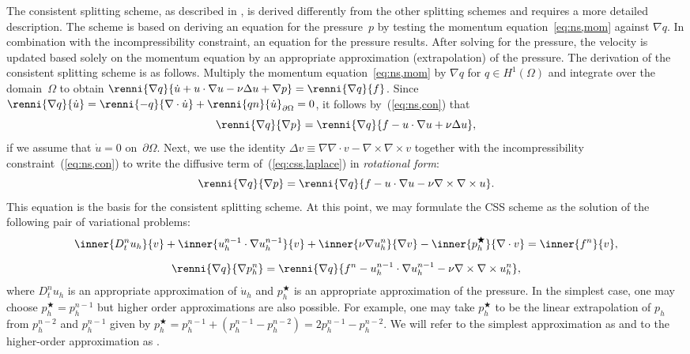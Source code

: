 The consistent splitting scheme, as described
in \citet{GuermondMinevShen2006,GuermondShen2003}, is derived
differently from the other splitting schemes and requires a more
detailed description. The scheme is based on deriving an equation for
the pressure~$p$ by testing the momentum equation~\eqref{eq:ns,mom}
against $\nabla q$.  In combination with the incompressibility
constraint, an equation for the pressure results. After solving for
the pressure, the velocity is updated based solely on the momentum
equation by an appropriate approximation (extrapolation) of the
pressure. The derivation of the consistent splitting scheme is as
follows. \pagebreak Multiply the momentum equation~\eqref{eq:ns,mom} by $\nabla
q$ for $q \in H^1(\Omega)$ and integrate over the domain~$\Omega$ to obtain
$\renni{\nabla q}{\dot{u} + u \cdot \nabla u - \nu \Delta u + \nabla
  p} = \renni{\nabla q}{f}$. Since $\renni{\nabla q}{\dot{u}} =
\renni{-q}{\nabla \cdot \dot{u}} + \renni{qn}{\dot{u}}_{\partial
  \Omega} = 0$, it follows by~(\ref{eq:ns,con}) that
\begin{equation}\label{eq:css,laplace}
  \renni{\nabla q}{\nabla p} = \renni{\nabla q}{f - u \cdot \nabla u +
    \nu \Delta u},
\end{equation}
if we assume that $\dot{u} = 0$ on~$\partial\Omega$. Next, we use the
identity $\Delta v \equiv \nabla \nabla \cdot v - \nabla \times \nabla
\times v$ together with the incompressibility
constraint~(\ref{eq:ns,con}) to write the diffusive term
of~(\ref{eq:css,laplace}) in
\emph{rotational form}:
\begin{equation}\label{eq:css,curl}
  \renni{\nabla q}{\nabla p} = \renni{\nabla q}{f - u \cdot \nabla u -
    \nu \nabla \times \nabla \times u}.
\end{equation}
This equation is the basis for the consistent splitting scheme. At
this point, we may formulate the CSS scheme as the solution of the
following pair of variational problems:
\begin{gather} \label{eq:css,u}
  \inner{D_t^n u_h}{v}
  + \inner{u_h^{n-1} \cdot \nabla u_h^{n-1}}{v}
  + \inner{\nu \nabla u_h^n}{\nabla v}
  - \inner{p_h^{\bigstar}}{\nabla \cdot v}
  = \inner{f^n}{v},\\[6pt]
 \label{eq:css,pn}
  \renni{\nabla q}{\nabla p_h^n} =
  \renni{\nabla q}{f^n - u_h^{n-1} \cdot \nabla u_h^{n-1} - \nu \nabla \times \nabla \times u_h^n},
\end{gather}
where $D_t^n u_h$ is an appropriate approximation of $\dot{u}_h$ and
$p^{\bigstar}_h$ is an appropriate approximation of the pressure. In
the simplest case, one may choose $p_h^{\bigstar} = p_h^{n-1}$ but
higher order approximations are also possible. For example, one may
take $p_h^{\bigstar}$ to be the linear extrapolation of $p_h$ from
$p_h^{n-2}$ and $p_h^{n-1}$ given by $p_h^{\bigstar} = p_h^{n-1} +
(p_h^{n-1} - p_h^{n-2}) = 2p_h^{n-1} - p_h^{n-2}$. We will refer to
the simplest approximation as  and to the higher-order
approximation as .

